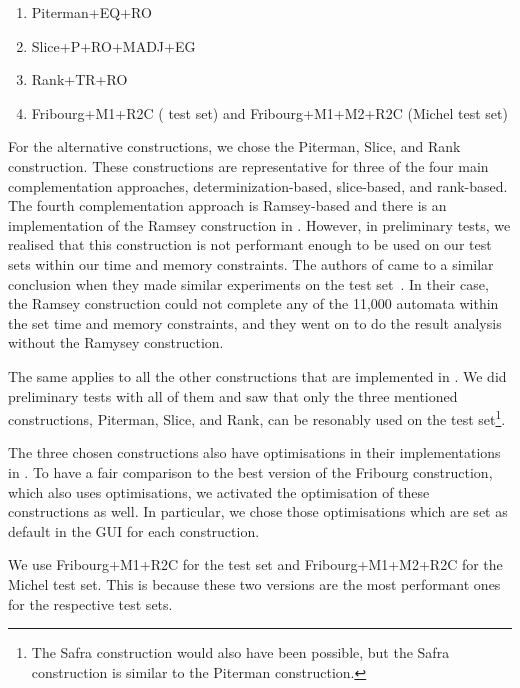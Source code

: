 \begin{enumerate}
\item Piterman+EQ+RO
\item Slice+P+RO+MADJ+EG
\item Rank+TR+RO
\item Fribourg+M1+R2C (\goal{} test set) and Fribourg+M1+M2+R2C (Michel test set)
\end{enumerate}

For the alternative constructions, we chose the Piterman, Slice, and Rank construction. These constructions are representative for three of the four main complementation approaches, determinization-based, slice-based, and rank-based. The fourth complementation approach is Ramsey-based and there is an implementation of the Ramsey construction in \goal{}. However, in preliminary tests, we realised that this construction is not performant enough to be used on our test sets within our time and memory constraints. The authors of \goal{} came to a similar conclusion when they made similar experiments on the \goal{} test set~\cite{2011_tsai}. In their case, the Ramsey construction could not complete any of the 11,000 automata within the set time and memory constraints, and they went on to do the result analysis without the Ramysey construction.

The same applies to all the other constructions that are implemented in \goal{}. We did preliminary tests with all of them and saw that only the three mentioned constructions, Piterman, Slice, and Rank, can be resonably used on the \goal{} test set\footnote{The Safra construction would also have been possible, but the Safra construction is similar to the Piterman construction.}.

The three chosen constructions also have optimisations in their implementations in \goal{}. To have a fair comparison to the best version of the Fribourg construction, which also uses optimisations, we activated the optimisation of these constructions as well. In particular, we chose those optimisations which are set as default in the \goal{} GUI for each construction.

We use Fribourg+M1+R2C for the \goal{} test set and Fribourg+M1+M2+R2C for the Michel test set. This is because these two versions are the most performant ones for the respective test sets.




